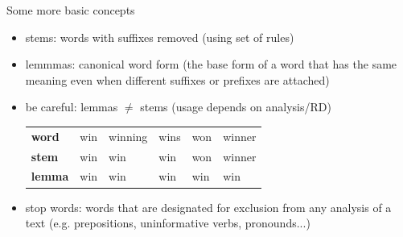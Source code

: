 \documentclass{beamer}
\begin{document}
\begin{frame}{Some more basic concepts}
\begin{itemize}[<+->]
\item stems: words with suffixes removed (using set of rules)
\item lemmmas: canonical word form (the base form of a word that has the same meaning even when different suffixes or prefixes are attached)
\item be careful: lemmas $\neq$ stems (usage depends on analysis/RD)
\begin{table}[]
\begin{tabular}{llllll}
{\color[HTML]{6434FC} \textbf{word}}  & win & winning & wins & won & winner \\
{\color[HTML]{6434FC} \textbf{stem}}  & win & win     & win  & won & winner \\
{\color[HTML]{6434FC} \textbf{lemma}} & win & win     & win  & win & win   
\end{tabular}
\end{table}
\item stop words: words that are designated for exclusion from any analysis of a text (e.g. prepositions, uninformative verbs, pronounds...)
 \end{itemize} 
\end{frame}




  \maketitle
\end{document}
